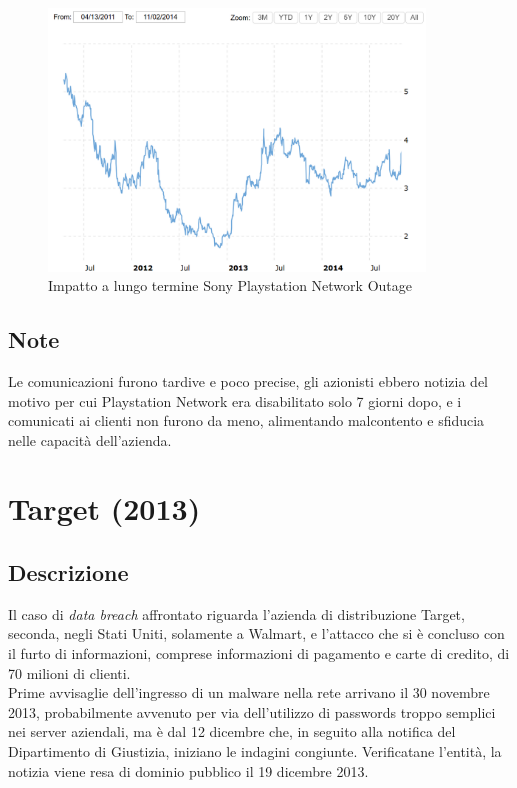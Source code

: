 \documentclass[12pt,a4paper,openright,twoside]{report}
\begin{document}
\begin{figure}[H] 
\begin{center} 
\includegraphics[width=10cm]{figures/sony_2011_longTerm.png} 
\caption[Grafico Sony PSN long]{Impatto a lungo termine Sony Playstation Network Outage}\label{fig:pnt2}
\end{center}
\end{figure}


\subsection{Note}
Le comunicazioni furono tardive e poco precise, gli azionisti ebbero notizia del motivo per cui Playstation Network era disabilitato solo 7 giorni dopo, e i comunicati ai clienti non furono da meno, alimentando malcontento e sfiducia nelle capacit\`a dell'azienda\cite{Sony_pnt}.
\section{Target (2013)}
\subsection{Descrizione}
Il caso di \textit{data breach} affrontato riguarda l'azienda di distribuzione Target, seconda, negli Stati Uniti, solamente a Walmart, e l'attacco che si \`e concluso con il furto di  informazioni, comprese informazioni di pagamento e carte di credito, di 70 milioni di clienti.\\
Prime avvisaglie dell'ingresso di un malware nella rete arrivano il 30 novembre 2013, probabilmente avvenuto per via dell'utilizzo di passwords troppo semplici nei server aziendali, ma \`e dal 12 dicembre che, in seguito alla notifica del Dipartimento di Giustizia, iniziano le indagini congiunte. Verificatane l'entit\`a, la notizia viene resa di dominio pubblico il 19 dicembre 2013\cite{Target}.\\
\end{document}
